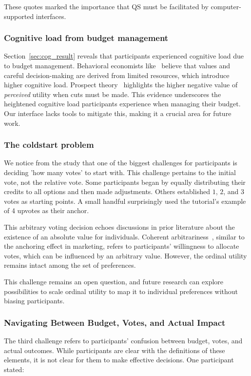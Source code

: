 These quotes marked the importance that QS must be facilitated by computer-supported interfaces.

\subsubsection{Cognitive load from budget management}
Section~\ref{sec:cog_result} reveals that participants experienced cognitive load due to budget management. Behavioral economists like~\textcite{Shah2015a} believe that values and careful decision-making are derived from limited resources, which introduce higher cognitive load. Prospect theory~\cite{kahnemanProspectTheoryAnalysis1979} highlights the higher negative value of \textit{perceived} utility when cuts must be made. This evidence underscores the heightened cognitive load participants experience when managing their budget. Our interface lacks tools to mitigate this, making it a crucial area for future work.

\subsubsection{The coldstart problem}
We notice from the study that one of the biggest challenges for participants is deciding 'how many votes' to start with. This challenge pertains to the initial vote, not the relative vote. Some participants began by equally distributing their credits to all options and then made adjustments. Others established $1$, $2$, and $3$ votes as starting points. A small handful surprisingly used the tutorial's example of 4 upvotes as their anchor.

This arbitrary voting decision echoes discussions in prior literature about the existence of an absolute value for individuals. Coherent arbitrariness~\cite{arielyCoherentArbitrarinessStable2003}, similar to the anchoring effect in marketing, refers to participants' willingness to allocate votes, which can be influenced by an arbitrary value. However, the ordinal utility remains intact among the set of preferences.

This challenge remains an open question, and future research can explore possibilities to scale ordinal utility to map it to individual preferences without biasing participants.

\subsubsection{Navigating Between Budget, Votes, and Actual Impact}
The third challenge refers to participants' confusion between budget, votes, and actual outcomes. While participants are clear with the definitions of these elements, it is not clear for them to make effective decisions. One participant stated:

